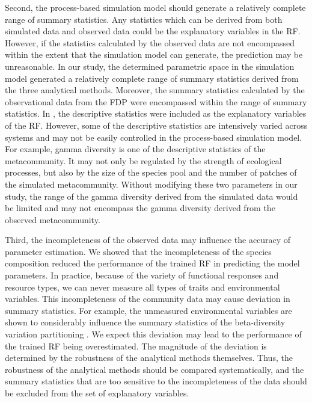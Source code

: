	Second, the process-based simulation model should generate a relatively complete range of summary statistics. Any statistics which can be derived from both simulated data and observed data could be the explanatory variables in the RF. However, if the statistics calculated by the observed data are not encompassed within the extent that the simulation model can generate, the prediction may be unreasonable. In our study, the determined parametric space in the simulation model generated a relatively complete range of summary statistics derived from the three analytical methods. Moreover, the summary statistics calculated by the observational data from the FDP were encompassed within the range of summary statistics. In \citet{guzman2022accounting}, the descriptive statistics were included as the explanatory variables of the RF. However, some of the descriptive statistics are intensively varied across systems and may not be easily controlled in the process-based simulation model. For example, gamma diversity is one of the descriptive statistics of the metacommunity. It may not only be regulated by the strength of ecological processes, but also by the size of the species pool and the number of patches of the simulated metacommunity. Without modifying these two parameters in our study, the range of the gamma diversity derived from the simulated data would be limited and may not encompass the gamma diversity derived from the observed metacommunity. 
	
	Third, the incompleteness of the observed data may influence the accuracy of parameter estimation. We showed that the incompleteness of the species composition reduced the performance of the trained RF in predicting the model parameters. In practice, because of the variety of functional responses and resource types, we can never measure all types of traits and environmental variables. This incompleteness of the community data may cause deviation in summary statistics. For example, the unmeasured environmental variables are shown to considerably influence the summary statistics of the beta-diversity variation partitioning \citep{chang2013better}. We expect this deviation may lead to the performance of the trained RF being overestimated. The magnitude of the deviation is determined by the robustness of the analytical methods themselves. Thus, the robustness of the analytical methods should be compared systematically, and the summary statistics that are too sensitive to the incompleteness of the data should be excluded from the set of explanatory variables.
	
